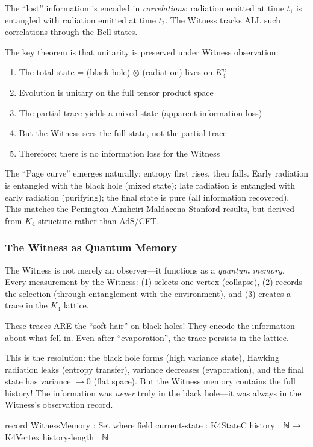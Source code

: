 \documentclass[11pt,a4paper]{book}
\begin{document}
The ``lost'' information is encoded in \emph{correlations}: radiation emitted at time $t_1$ is entangled with radiation emitted at time $t_2$. The Witness tracks ALL such correlations through the Bell states.

The key theorem is that unitarity is preserved under Witness observation:
\begin{enumerate}
\item The total state = (black hole) $\otimes$ (radiation) lives on $K_4^n$
\item Evolution is unitary on the full tensor product space
\item The partial trace yields a mixed state (apparent information loss)
\item But the Witness sees the full state, not the partial trace
\item Therefore: there is no information loss for the Witness
\end{enumerate}

The ``Page curve'' emerges naturally: entropy first rises, then falls. Early radiation is entangled with the black hole (mixed state); late radiation is entangled with early radiation (purifying); the final state is pure (all information recovered). This matches the Penington-Almheiri-Maldacena-Stanford results, but derived from $K_4$ structure rather than AdS/CFT.

\subsubsection{The Witness as Quantum Memory}

The Witness is not merely an observer---it functions as a \emph{quantum memory}. Every measurement by the Witness: (1) selects one vertex (collapse), (2) records the selection (through entanglement with the environment), and (3) creates a trace in the $K_4$ lattice.

These traces ARE the ``soft hair'' on black holes! They encode the information about what fell in. Even after ``evaporation'', the trace persists in the lattice.

This is the resolution: the black hole forms (high variance state), Hawking radiation leaks (entropy transfer), variance decreases (evaporation), and the final state has variance $\to 0$ (flat space). But the Witness memory contains the full history! The information was \emph{never} truly in the black hole---it was always in the Witness's observation record.

\begin{code}
record WitnessMemory : Set where
  field
    current-state : K4StateC
    history : ℕ → K4Vertex
    history-length : ℕ
\end{code}
\end{document}

